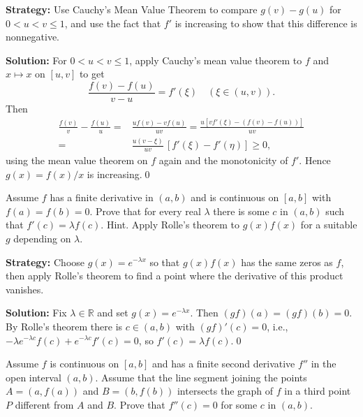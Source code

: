 \noindent\textbf{Strategy:} Use Cauchy's Mean Value Theorem to compare \( g(v) - g(u) \) for \( 0 < u < v \leq 1 \), and use the fact that \( f' \) is increasing to show that this difference is nonnegative.

\bigskip\noindent\textbf{Solution:}
For $0<u<v\le 1$, apply Cauchy's mean value theorem to $f$ and $x\mapsto x$ on $[u,v]$ to get
\[\frac{f(v)-f(u)}{v-u}=f'(\xi)\quad(\xi\in(u,v)).\]
Then
\begin{align*}
\frac{f(v)}{v}-\frac{f(u)}{u}=&\frac{uf(v)-vf(u)}{uv}=\frac{u[v f'(\xi)-(f(v)-f(u))]}{uv} \\
=& \frac{u(v-\xi)}{uv}\,[f'(\xi)-f'(\eta)]\ge 0,
\end{align*}
using the mean value theorem on $f$ again and the monotonicity of $f'$. Hence $g(x)=f(x)/x$ is increasing.\qed


\begin{problembox}
\begin{problemstatement}
Assume \( f \) has a finite derivative in \( (a, b) \) and is continuous on \( [a, b] \) with \( f(a) = f(b) = 0 \). Prove that for every real \( \lambda \) there is some \( c \) in \( (a, b) \) such that \( f'(c) = \lambda f(c) \). Hint. Apply Rolle's theorem to \( g(x)f(x) \) for a suitable \( g \) depending on \( \lambda \).
\end{problemstatement}
\end{problembox}

\noindent\textbf{Strategy:} Choose \( g(x) = e^{-\lambda x} \) so that \( g(x)f(x) \) has the same zeros as \( f \), then apply Rolle's theorem to find a point where the derivative of this product vanishes.

\bigskip\noindent\textbf{Solution:}
Fix $\lambda\in\mathbb{R}$ and set $g(x)=e^{-\lambda x}$. Then $(gf)(a)=(gf)(b)=0$. By Rolle's theorem there is $c\in(a,b)$ with $(gf)'(c)=0$, i.e., $-\lambda e^{-\lambda c}f(c)+e^{-\lambda c}f'(c)=0$, so $f'(c)=\lambda f(c)$.\qed


\begin{problembox}
\begin{problemstatement}
Assume \( f \) is continuous on \( [a, b] \) and has a finite second derivative \( f'' \) in the open interval \( (a, b) \). Assume that the line segment joining the points \( A = (a, f(a)) \) and \( B = (b, f(b)) \) intersects the graph of \( f \) in a third point \( P \) different from \( A \) and \( B \). Prove that \( f''(c) = 0 \) for some \( c \) in \( (a, b) \).
\end{problemstatement}
\end{problembox}


